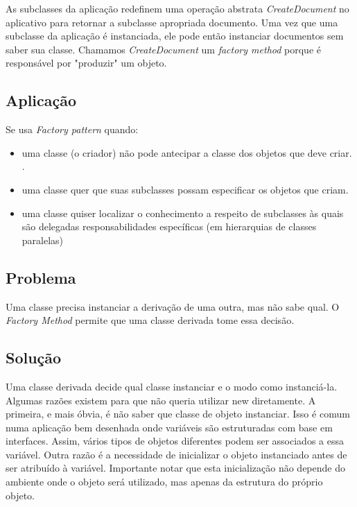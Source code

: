 As subclasses da aplicação redefinem uma operação abstrata \emph{CreateDocument} no 
aplicativo para retornar a subclasse apropriada documento. Uma vez que uma subclasse da aplicação é instanciada, ele pode então instanciar documentos sem saber sua classe. Chamamos \emph{CreateDocument} um \emph{factory method} porque é
responsável por "produzir" um objeto.\cite{gamma95}

\subsection{Aplicação}
\label{sub:fac_aplica}

Se usa \emph{Factory pattern} quando:\cite{gamma95}

\begin{itemize}
	\item uma classe (o criador) não pode antecipar a classe dos objetos que deve criar.
.	\item uma classe quer que suas subclasses possam especificar os objetos que criam.
	\item uma classe quiser localizar o conhecimento a respeito de subclasses às quais são delegadas responsabilidades específicas (em hierarquias de classes paralelas)

\end{itemize}


\subsection{Problema}
\label{sub:fac_problema}

Uma classe precisa instanciar a derivação de uma outra, mas não sabe qual. O \emph{Factory Method} permite que uma classe derivada tome essa decisão.

\subsection{Solução}
\label{sub:fac_solucao}

Uma classe derivada decide qual classe instanciar e o modo como instanciá-la.
Algumas razões existem para que não queria utilizar new diretamente. A primeira, e
mais óbvia, é não saber que classe de objeto instanciar.
Isso é comum numa aplicação bem desenhada onde variáveis são estruturadas com
base em interfaces. Assim, vários tipos de objetos diferentes podem ser associados a
essa variável. Outra razão é a necessidade de inicializar o objeto instanciado antes de ser
atribuído à variável. Importante notar
que esta inicialização não depende do ambiente onde o objeto será utilizado, mas apenas
da estrutura do próprio objeto.\cite{fact1}\cite{gamma95}



